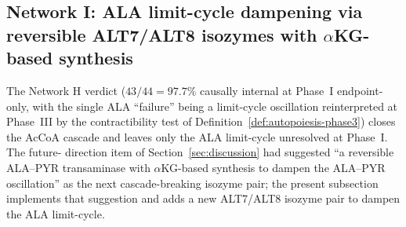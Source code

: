 \documentclass[11pt,a4paper]{article}
\theoremstyle{plain}
\theoremstyle{definition}
\theoremstyle{remark}
\begin{document}
\subsection{Network I: ALA limit-cycle dampening via reversible ALT7/ALT8
isozymes with $\alpha$KG-based synthesis}
\label{sec:autopoiesis-network-I}

The Network H verdict ($43/44 = 97.7\%$ causally internal at Phase~I
endpoint-only, with the single ALA ``failure'' being a limit-cycle
oscillation reinterpreted at Phase~III by the contractibility test of
Definition~\ref{def:autopoiesis-phase3}) closes the AcCoA cascade and
leaves only the ALA limit-cycle unresolved at Phase~I. The future-
direction item of Section~\ref{sec:discussion} had suggested ``a
reversible ALA--PYR transaminase with $\alpha$KG-based synthesis to
dampen the ALA--PYR oscillation'' as the next cascade-breaking isozyme
pair; the present subsection implements that suggestion and adds a new
ALT7/ALT8 isozyme pair to dampen the ALA limit-cycle.
\end{document}
